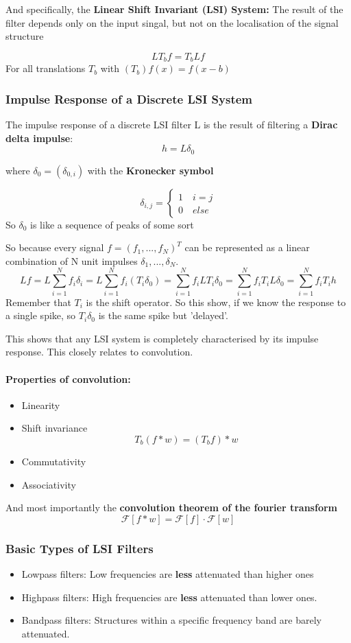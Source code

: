 \documentclass{article}
\begin{document}
And specifically, the \textbf{Linear Shift Invariant (LSI) System: } The result of the filter depends only on the input singal, but not on the localisation of the signal structure

\[LT_bf = T_bLf\]
For all translations $T_b$ with $(T_b)f(x) = f(x-b)$

\subsubsection{Impulse Response of a Discrete LSI System}
The impulse response of a discrete LSI filter L is the result of filtering a \textbf{Dirac delta impulse}: 
\[h = L\delta_0\]

where $\delta_0 = (\delta_{0,i})$ with the \textbf{Kronecker symbol}

\[\delta_{i,j} = \begin{cases}
  1 \quad i = j \\
  0 \quad else
\end{cases}\]
So $\delta_0$ is like a sequence of peaks of some sort

So because every signal $f = (f_1,...,f_N)^T$ can be represented as a linear combination of N unit impulses $\delta_1,...,\delta_N$. 
\[Lf = L\sum_{i=1}^Nf_i\delta_i = L\sum_{i=1}^N f_i(T_i\delta_0) = \sum_{i=1}^Nf_iLT_i\delta_0 = \sum_{i=1}^Nf_iT_iL\delta_0 = \sum_{i=1}^Nf_iT_ih \]
Remember that $T_i$ is the shift operator. So this show, if we know the response to a single spike, so $T_i\delta_0$ is the same spike but 'delayed'.

This shows that any LSI system is completely characterised by its impulse response. This closely relates to convolution.

\paragraph{Properties of convolution: }
\begin{itemize}
  \item Linearity
  \item Shift invariance 
  \[T_b(f\ast w) = (T_bf)\ast w\]
  \item Commutativity
  \item Associativity
\end{itemize}
And most importantly the \textbf{convolution theorem of the fourier transform}
\[\mathcal{F}[f\ast w] = \mathcal{F}[f]\cdot \mathcal{F}[w]\]
\subsubsection{Basic Types of LSI Filters}
\begin{itemize}
  \item Lowpass filters: Low frequencies are \textbf{less} attenuated than higher ones
  \item Highpass filters: High frequencies are \textbf{less} attenuated than lower ones.
  \item Bandpass filters: Structures within a specific frequency band are barely attenuated.
\end{itemize}
\end{document}
